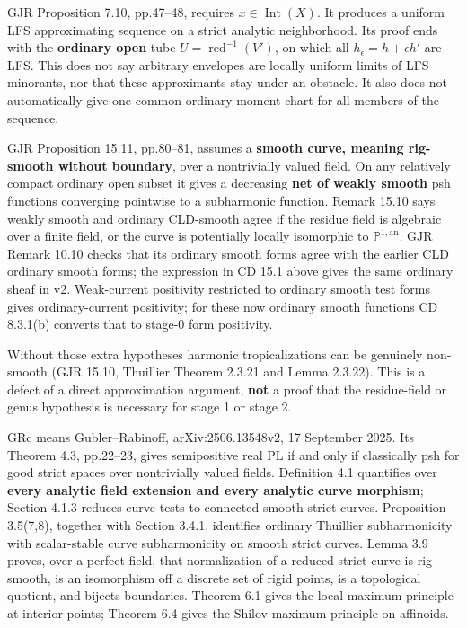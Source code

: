 \documentclass[
  11pt,
]{article}
\begin{document}
GJR Proposition 7.10, pp.47--48, requires \(x\in\operatorname{Int}(X)\).
It produces a uniform LFS approximating sequence on a strict analytic
neighborhood. Its proof ends with the \textbf{ordinary open} tube
\(U=\operatorname{red}^{-1}(V')\), on which all
\(h_\epsilon=h+\epsilon h'\) are LFS. This does not say arbitrary
envelopes are locally uniform limits of LFS minorants, nor that these
approximants stay under an obstacle. It also does not automatically give
one common ordinary moment chart for all members of the sequence.

GJR Proposition 15.11, pp.80--81, assumes a \textbf{smooth curve,
meaning rig-smooth without boundary}, over a nontrivially valued field.
On any relatively compact ordinary open subset it gives a decreasing
\textbf{net of weakly smooth} psh functions converging pointwise to a
subharmonic function. Remark 15.10 says weakly smooth and ordinary
CLD-smooth agree if the residue field is algebraic over a finite field,
or the curve is potentially locally isomorphic to
\(\mathbb P^{1,\mathrm{an}}\). GJR Remark 10.10 checks that its ordinary
smooth forms agree with the earlier CLD ordinary smooth forms; the
expression in CD 15.1 above gives the same ordinary sheaf in v2.
Weak-current positivity restricted to ordinary smooth test forms gives
ordinary-current positivity; for these now ordinary smooth functions CD
8.3.1(b) converts that to stage-0 form positivity.

Without those extra hypotheses harmonic tropicalizations can be
genuinely non-smooth (GJR 15.10, Thuillier Theorem 2.3.21 and Lemma
2.3.22). This is a defect of a direct approximation argument,
\textbf{not} a proof that the residue-field or genus hypothesis is
necessary for stage 1 or stage 2.

GRc means Gubler--Rabinoff, arXiv:2506.13548v2, 17 September 2025. Its
Theorem 4.3, pp.22--23, gives semipositive real PL if and only if
classically psh for good strict spaces over nontrivially valued fields.
Definition 4.1 quantifies over \textbf{every analytic field extension
and every analytic curve morphism}; Section 4.1.3 reduces curve tests to
connected smooth strict curves. Proposition 3.5(7,8), together with
Section 3.4.1, identifies ordinary Thuillier subharmonicity with
scalar-stable curve subharmonicity on smooth strict curves. Lemma 3.9
proves, over a perfect field, that normalization of a reduced strict
curve is rig-smooth, is an isomorphism off a discrete set of rigid
points, is a topological quotient, and bijects boundaries. Theorem 6.1
gives the local maximum principle at interior points; Theorem 6.4 gives
the Shilov maximum principle on affinoids.
\end{document}
